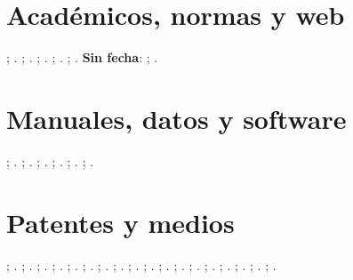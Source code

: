 \documentclass[a4paper,12pt]{article}
\begin{document}
\section*{Académicos, normas y web}
\citet{thesis-1-complete}; \citep{thesis-1-complete}.
\citet{thesis-2-missing-type-institution}; \citep{thesis-2-missing-type-institution}.
\citet{std-1-complete}; \citep{std-1-complete}.
\citet{std-2-missing-organization-number}; \citep{std-2-missing-organization-number}.
\citet{online-1-with-doi}; \citep{online-1-with-doi}.
\textbf{Sin fecha}: \citet{online-2-url-only-no-date}; \citep{online-2-url-only-no-date}.
\section*{Manuales, datos y software}
\citet{manual-1-complete}; \citep{manual-1-complete}.
\citet{manual-2-missing-org}; \citep{manual-2-missing-org}.
\citet{dataset-1-complete-doi}; \citep{dataset-1-complete-doi}.
\citet{dataset-2-url-only}; \citep{dataset-2-url-only}.
\citet{soft-1-complete}; \citep{soft-1-complete}.
\citet{soft-2-missing-version-date}; \citep{soft-2-missing-version-date}.
\section*{Patentes y medios}
\citet{pat-1-complete}; \citep{pat-1-complete}.
\citet{pat-2-missing-holder}; \citep{pat-2-missing-holder}.
\citet{video-1-complete}; \citep{video-1-complete}.
\citet{video-2-missing-author-has-org}; \citep{video-2-missing-author-has-org}.
\citet{audio-1-complete}; \citep{audio-1-complete}.
\citet{audio-2-missing-number}; \citep{audio-2-missing-number}.
\citet{art-obj-1-complete}; \citep{art-obj-1-complete}.
\citet{img-1-missing-author-has-org}; \citep{img-1-missing-author-has-org}.
\citet{press-1-complete}; \citep{press-1-complete}.
\citet{press-2-missing-url}; \citep{press-2-missing-url}.
\citet{letter-1-complete}; \citep{letter-1-complete}.
\citet{letter-2-missing-recipient}; \citep{letter-2-missing-recipient}.
\citet{unpub-1-complete}; \citep{unpub-1-complete}.
\citet{unpub-2-missing-date}; \citep{unpub-2-missing-date}.
\citet{interv-1-complete}; \citep{interv-1-complete}.
\citet{interv-2-missing-interviewer}; \citep{interv-2-missing-interviewer}.
\citet{misc-1-complete}; \citep{misc-1-complete}.
\citet{misc-2-missing-author-date}; \citep{misc-2-missing-author-date}.
\printbibliography[title={Referencias}]
\end{document}
